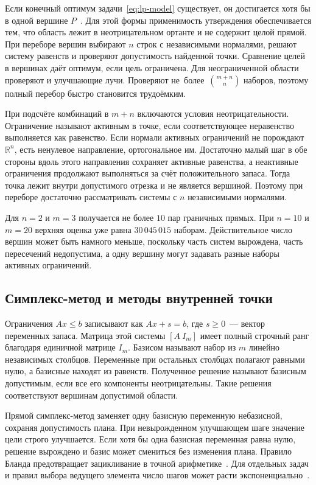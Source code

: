 Если конечный оптимум задачи~\eqref{eq:lp-model} существует, он
достигается хотя бы в одной вершине $P$~\cite{vanderbei2020}. Для этой
формы применимость утверждения обеспечивается тем, что область лежит
в неотрицательном ортанте и не содержит целой прямой. При переборе
вершин выбирают $n$ строк с независимыми нормалями, решают систему
равенств и проверяют допустимость найденной точки. Сравнение целей
в вершинах даёт оптимум, если цель ограничена. Для неограниченной
области проверяют и улучшающие лучи.
Проверяют не~более~$\binom{m+n}{n}$ наборов, поэтому полный перебор
быстро становится трудоёмким.

При подсчёте комбинаций в $m+n$ включаются условия неотрицательности.
Ограничение называют активным в точке, если соответствующее неравенство
выполняется как равенство. Если нормали активных ограничений не
порождают $\mathbb{R}^{n}$, есть ненулевое направление, ортогональное им.
Достаточно малый шаг в обе стороны вдоль этого направления сохраняет
активные равенства, а неактивные ограничения продолжают выполняться
за счёт положительного запаса. Тогда точка лежит внутри допустимого
отрезка и не является вершиной. Поэтому при переборе достаточно
рассматривать системы с $n$ независимыми нормалями.

Для $n=2$ и $m=3$ получается не более $10$ пар граничных прямых.
При $n=10$ и $m=20$ верхняя оценка уже равна $30\,045\,015$
наборам. Действительное число вершин может быть намного меньше,
поскольку часть систем вырождена, часть пересечений недопустима,
а одну вершину могут задавать разные наборы активных ограничений.

\subsection{Симплекс-метод и методы внутренней точки}

Ограничения $Ax\le b$ записывают как $Ax+s=b$, где $s\ge 0$~--- вектор
переменных запаса. Матрица этой системы $[A\ I_m]$ имеет полный
строчный ранг благодаря единичной матрице $I_m$. Базисом называют
набор из $m$ линейно независимых столбцов. Переменные при остальных
столбцах полагают равными нулю, а базисные находят из равенств.
Полученное решение называют базисным допустимым, если все его
компоненты неотрицательны. Такие решения соответствуют вершинам
допустимой области.

Прямой симплекс-метод заменяет одну базисную переменную небазисной,
сохраняя допустимость плана. При невырожденном улучшающем шаге
значение цели строго улучшается. Если хотя бы одна базисная переменная
равна нулю, решение вырождено и базис может смениться без изменения плана.
Правило Бланда предотвращает зацикливание в точной
арифметике~\cite{bland1977}. Для отдельных задач и правил выбора
ведущего элемента число шагов может расти
экспоненциально~\cite{vanderbei2020}.

